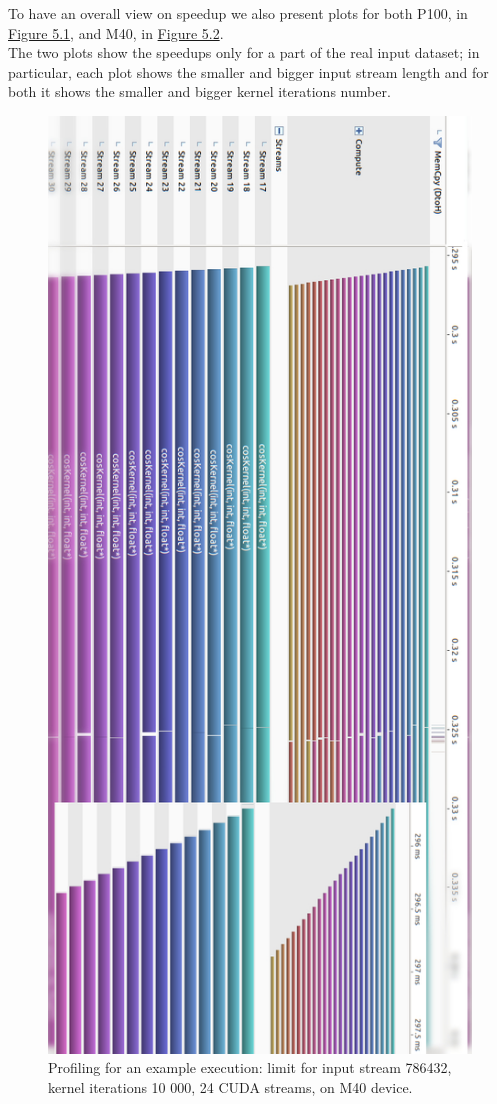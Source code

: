	To have an overall view on speedup we also present plots for both P100, in  \hyperref[fig:p100sp]{Figure 5.1}, and M40, in \hyperref[fig:m40sp]{Figure 5.2}.\\
	The two plots show the speedups only for a part of the real input dataset; in particular, each plot shows the smaller and bigger input stream length and for both it shows the smaller and bigger kernel iterations number.
	\begin{figure}
		\vspace{-2cm}
		\centering
		\includegraphics[scale=0.52]{plots/cos_profile.jpg}
		\caption{Profiling for an example execution: limit for input stream 786432, kernel iterations 10 000, 24 CUDA streams, on M40 device.}
		\label{fig:cosprofiling}
	
	\end{figure}
	
